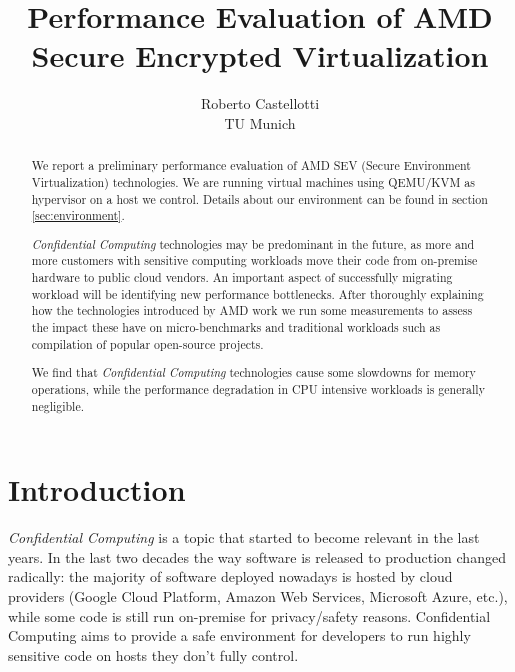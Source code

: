 \documentclass[twocolumn]{article}
\begin{document}
\date{}
\title{\Large \bf Performance Evaluation of AMD Secure Encrypted Virtualization}
\author{{\rm Roberto Castellotti}\\TU Munich}
\maketitle

\begin{abstract}
We report a preliminary performance evaluation of AMD SEV (Secure Environment Virtualization) technologies.
We are running virtual machines using QEMU/KVM as hypervisor on a host we control.
Details about our environment can be found in section \ref{sec:environment}.

\textit{Confidential Computing} technologies may be predominant in the future, as more and more customers with sensitive computing workloads move their code  from on-premise hardware to public cloud vendors. An important aspect of successfully migrating workload will be identifying new performance bottlenecks. After thoroughly explaining how the technologies introduced by AMD work we run some measurements to assess the impact these have on micro-benchmarks and traditional workloads such as compilation of popular open-source projects.

We find that \textit{Confidential Computing} technologies cause some slowdowns for memory operations, while the performance degradation in CPU intensive workloads is generally negligible.
\end{abstract}

\section{Introduction}

\textit{Confidential Computing} is a topic that started to become relevant in the last years. In the last two decades the way software is released to production changed radically: the majority of software deployed nowadays is hosted by cloud providers (Google Cloud Platform, Amazon Web Services, Microsoft Azure, etc.), while some code is still run on-premise for privacy/safety reasons. Confidential Computing aims to provide a safe environment for developers to run highly sensitive code on hosts they don't fully control. 
\end{document}
